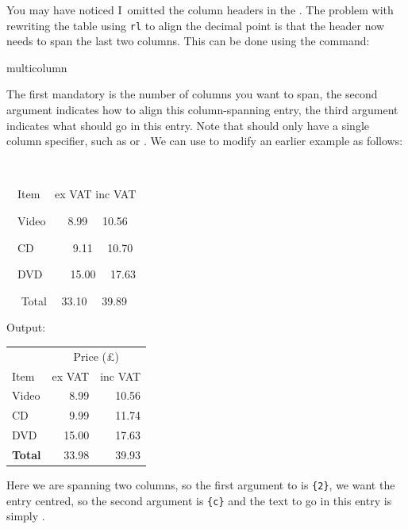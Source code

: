 You may have noticed I~omitted the column headers in the . 
The problem with rewriting the table using 
\texttt{rl} to align the decimal point is that the header
now needs to span the last two columns.
This can be done using the command:
\begin{definition}
\gls{multicolumn}
\end{definition}%
The first \gls{mandatory}  is the number of
columns you want to span, the second argument 
indicates how to align this column-spanning entry, the third
argument  indicates what should go in this entry. Note
that  should only have a single column
specifier, such as \texttt{} or \texttt{}.  We can
use  to modify an earlier example as
follows:\screenpagebreak
\begin{code}
\newline
\strut~~~~~~~~ \newline
\strut~~Item~~ ex VAT  inc
VAT\newline
\strut~~Video~~~~8.99 ~~10.56 \newline
\strut~~CD~~~~~~~9.11 ~~10.70 \newline
\strut~~DVD~~~~~15.00 ~~17.63 \newline
\strut~~ Total ~~33.10 ~~39.89\newline
{}
\end{code}%
Output:
\begin{result}
\begin{tabular}{lrr}
 & \multicolumn{2}{c}{Price (\pounds)}\\
Item  & ex VAT & inc VAT\\ 
Video & 8.99 & 10.56\\
CD & 9.99 & 11.74\\
DVD & 15.00 & 17.63\\
\bfseries Total & 33.98 & 39.93
\end{tabular}
\end{result}%
Here we are spanning two columns, so the first argument to  is \verb|{2}|,
we want the entry centred, so the second argument is \verb|{c}| and the text to go in this entry 
is simply \texttt{}.

